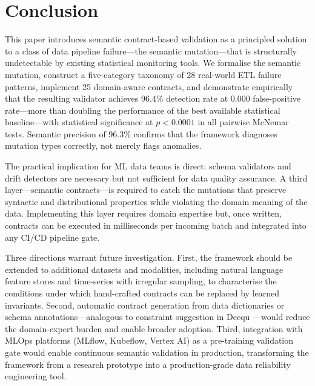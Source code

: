 \documentclass[journal]{IEEEtran}
\begin{document}
\section{Conclusion}
\label{sec:conclusion}

This paper introduces semantic contract-based validation as a principled
solution to a class of data pipeline failure---the semantic mutation---that
is structurally undetectable by existing statistical monitoring tools.  We
formalise the semantic mutation, construct a five-category taxonomy of 28
real-world ETL failure patterns, implement 25 domain-aware contracts, and
demonstrate empirically that the resulting validator achieves 96.4\%
detection rate at 0.000 false-positive rate---more than doubling the
performance of the best available statistical baseline---with statistical
significance at $p < 0.0001$ in all pairwise McNemar tests.  Semantic
precision of 96.3\% confirms that the framework diagnoses mutation types
correctly, not merely flags anomalies.

The practical implication for ML data teams is direct: schema validators
and drift detectors are necessary but not sufficient for data quality
assurance.  A third layer---semantic contracts---is required to catch the
mutations that preserve syntactic and distributional properties while
violating the domain meaning of the data.  Implementing this layer requires
domain expertise but, once written, contracts can be executed in
milliseconds per incoming batch and integrated into any CI/CD pipeline gate.

Three directions warrant future investigation.  First, the framework should
be extended to additional datasets and modalities, including natural language
feature stores and time-series with irregular sampling, to characterise the
conditions under which hand-crafted contracts can be replaced by learned
invariants.  Second, automatic contract generation from data dictionaries or
schema annotations---analogous to constraint suggestion in
Deequ \cite{schelter2018deequ}---would reduce the domain-expert burden and
enable broader adoption.  Third, integration with MLOps platforms (MLflow,
Kubeflow, Vertex AI) as a pre-training validation gate would enable
continuous semantic validation in production, transforming the framework
from a research prototype into a production-grade data reliability
engineering tool.
\end{document}
